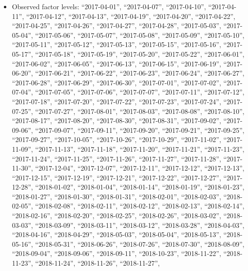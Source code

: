 \documentclass[
  letterpaper,
  DIV=11,
  numbers=noendperiod]{scrartcl}
\providecommand{\tightlist}{%
  \setlength{\itemsep}{0pt}\setlength{\parskip}{0pt}}
\begin{document}
\begin{itemize}
\tightlist
\item
  Observed factor levels: ``2017-04-01'', ``2017-04-07'',
  ``2017-04-10'', ``2017-04-11'', ``2017-04-12'', ``2017-04-13'',
  ``2017-04-19'', ``2017-04-20'', ``2017-04-22'', ``2017-04-25'',
  ``2017-04-26'', ``2017-04-27'', ``2017-04-28'', ``2017-05-03'',
  ``2017-05-04'', ``2017-05-06'', ``2017-05-07'', ``2017-05-08'',
  ``2017-05-09'', ``2017-05-10'', ``2017-05-11'', ``2017-05-12'',
  ``2017-05-13'', ``2017-05-15'', ``2017-05-16'', ``2017-05-17'',
  ``2017-05-18'', ``2017-05-19'', ``2017-05-20'', ``2017-05-22'',
  ``2017-06-01'', ``2017-06-02'', ``2017-06-05'', ``2017-06-13'',
  ``2017-06-15'', ``2017-06-19'', ``2017-06-20'', ``2017-06-21'',
  ``2017-06-22'', ``2017-06-23'', ``2017-06-24'', ``2017-06-27'',
  ``2017-06-28'', ``2017-06-29'', ``2017-06-30'', ``2017-07-01'',
  ``2017-07-02'', ``2017-07-04'', ``2017-07-05'', ``2017-07-06'',
  ``2017-07-07'', ``2017-07-11'', ``2017-07-12'', ``2017-07-18'',
  ``2017-07-20'', ``2017-07-22'', ``2017-07-23'', ``2017-07-24'',
  ``2017-07-25'', ``2017-07-27'', ``2017-08-01'', ``2017-08-03'',
  ``2017-08-08'', ``2017-08-10'', ``2017-08-17'', ``2017-08-20'',
  ``2017-08-30'', ``2017-08-31'', ``2017-09-02'', ``2017-09-06'',
  ``2017-09-07'', ``2017-09-11'', ``2017-09-20'', ``2017-09-21'',
  ``2017-09-25'', ``2017-09-27'', ``2017-10-05'', ``2017-10-26'',
  ``2017-10-29'', ``2017-11-02'', ``2017-11-09'', ``2017-11-13'',
  ``2017-11-18'', ``2017-11-20'', ``2017-11-21'', ``2017-11-23'',
  ``2017-11-24'', ``2017-11-25'', ``2017-11-26'', ``2017-11-27'',
  ``2017-11-28'', ``2017-11-30'', ``2017-12-04'', ``2017-12-07'',
  ``2017-12-11'', ``2017-12-12'', ``2017-12-13'', ``2017-12-15'',
  ``2017-12-19'', ``2017-12-21'', ``2017-12-22'', ``2017-12-27'',
  ``2017-12-28'', ``2018-01-02'', ``2018-01-04'', ``2018-01-14'',
  ``2018-01-19'', ``2018-01-23'', ``2018-01-27'', ``2018-01-30'',
  ``2018-01-31'', ``2018-02-01'', ``2018-02-03'', ``2018-02-05'',
  ``2018-02-08'', ``2018-02-11'', ``2018-02-12'', ``2018-02-13'',
  ``2018-02-14'', ``2018-02-16'', ``2018-02-20'', ``2018-02-25'',
  ``2018-02-26'', ``2018-03-02'', ``2018-03-03'', ``2018-03-09'',
  ``2018-03-11'', ``2018-03-12'', ``2018-03-28'', ``2018-04-03'',
  ``2018-04-16'', ``2018-04-29'', ``2018-05-03'', ``2018-05-04'',
  ``2018-05-13'', ``2018-05-16'', ``2018-05-31'', ``2018-06-26'',
  ``2018-07-26'', ``2018-07-30'', ``2018-08-09'', ``2018-09-04'',
  ``2018-09-06'', ``2018-09-11'', ``2018-10-23'', ``2018-11-22'',
  ``2018-11-23'', ``2018-11-24'', ``2018-11-26'', ``2018-11-27'',

\end{itemize}
\end{document}
